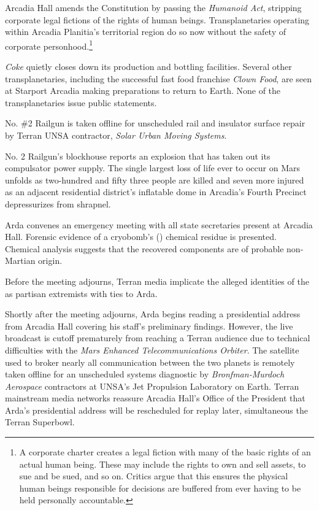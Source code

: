 Arcadia Hall amends the Constitution by passing the {\it Humanoid Act}, stripping corporate legal fictions of the rights of human beings. Transplanetaries operating within Arcadia Planitia's territorial region do so now without the safety of corporate personhood.\footnote{A corporate charter creates a legal fiction with many of the basic rights of an actual human being. These may include the rights to own and sell assets, to sue and be sued, and so on. Critics argue that this ensures the physical human beings responsible for decisions are buffered from ever having to be held personally accountable.}
\StopTimelineDate

{\it Coke} quietly closes down its production and bottling facilities. Several other transplanetaries, including the successful fast food franchise {\it Clown Food}, are seen at Starport Arcadia making preparations to return to Earth. None of the transplanetaries issue public statements.
\StopTimelineDate

No. \#2 Railgun is taken offline for unscheduled rail and insulator surface repair by Terran UNSA contractor, {\it Solar Urban Moving Systems}.
\StopTimelineDate

No. \type{#}2 Railgun's blockhouse reports an explosion that has taken out its compulsator power supply. The single largest loss of life ever to occur on Mars unfolds as two-hundred and fifty three people are killed and seven more injured as an adjacent residential district's inflatable dome in Arcadia's Fourth Precinct depressurizes from shrapnel.

Arda convenes an emergency meeting with all state secretaries present at Arcadia Hall. Forensic evidence of a cryobomb's () chemical residue is presented. Chemical analysis suggests that the recovered components are of probable non-Martian origin. 

Before the meeting adjourns, Terran media implicate the alleged identities of the  as partisan extremists with ties to Arda. 

Shortly after the meeting adjourns, Arda begins reading a presidential address from Arcadia Hall covering his staff's preliminary findings. However, the live broadcast is cutoff prematurely from reaching a Terran audience due to technical difficulties with the {\it Mars Enhanced Telecommunications Orbiter}. The satellite used to broker nearly all communication between the two planets is remotely taken offline for an unscheduled systems diagnostic by {\it Bronfman-Murdoch Aerospace} contractors at UNSA's Jet Propulsion Laboratory on Earth. Terran mainstream media networks reassure Arcadia Hall's Office of the President that Arda's presidential address will be rescheduled for replay later, simultaneous the Terran Superbowl.


